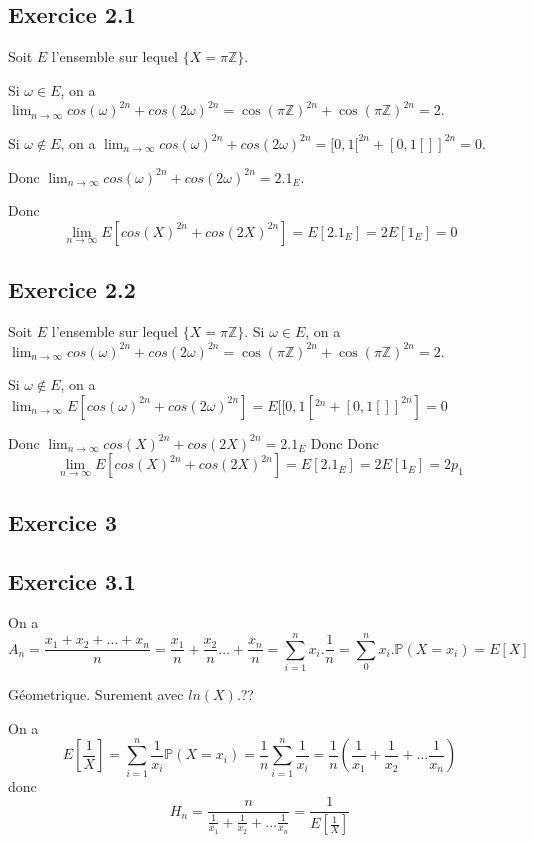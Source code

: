 \documentclass[]{book}
\theoremstyle{definition}
\newcommand{\bb}[1]{\mathbb{#1}}
\newcommand{\Z}{\bb{Z}}
\newcommand{\Pe}{\bb{P}}
\begin{document}
\subsection*{Exercice 2.1}
Soit $E$ l'ensemble sur lequel $\{X = \pi \Z \}$. 


Si $\omega \in E$, on a $\lim_{n \to \infty} cos(\omega)^{2n} + cos(2\omega)^{2n} = \cos(\pi\Z)^{2n}+\cos(\pi\Z)^{2n} = 2$. 

Si $\omega \notin E$, on a $\lim_{n \to \infty} cos(\omega)^{2n} + cos(2\omega)^{2n} = [0,1[^{2n}+[0,1[]]^{2n} = 0$. 

Donc $\lim_{n \to \infty} cos(\omega)^{2n} + cos(2\omega)^{2n} = 2.1_E$.

Donc 
$$
\lim_{n \to \infty} E[cos(X)^{2n} + cos(2X)^{2n}] = E[2.1_E] = 2E[1_E] = 0
$$

\subsection*{Exercice 2.2}
Soit $E$ l'ensemble sur lequel $\{X = \pi \Z \}$. 
Si $\omega \in E$, on a $\lim_{n \to \infty} cos(\omega)^{2n} + cos(2\omega)^{2n} = \cos(\pi\Z)^{2n}+\cos(\pi\Z)^{2n} = 2$. 

Si $\omega \notin E$, on a $\lim_{n \to \infty} E[cos(\omega)^{2n} + cos(2\omega)^{2n}] = E[[0,1[^{2n}+[0,1[]]^{2n}] = 0$

Donc $\lim_{n \to \infty} cos(X)^{2n} + cos(2X)^{2n} = 2.1_E$
Donc
Donc 
$$
\lim_{n \to \infty} E[cos(X)^{2n} + cos(2X)^{2n}] = E[2.1_E] = 2E[1_E] = 2p_1
$$


\subsection*{Exercice 3}
\subsection*{Exercice 3.1}
On a 
$$
A_n = \frac{x_1+x_2+\ldots + x_n}{n} = \frac{x_1}{n}+ \frac{x_2}{n} \ldots + \frac{x_n}{n} = \sum_{i=1}^{n}x_i.\frac{1}{n} = \sum_{0}^{n}x_i.\Pe(X=x_i) = E[X]
$$

G\'eometrique. Surement avec $ln(X)$.??

On a
$$
E[\frac{1}{X}] = \sum_{i=1}^{n}{\frac{1}{x_i}\Pe(X=x_i)} =  \frac{1}{n}\sum_{i=1}^{n}{\frac{1}{x_i}} = \frac{1}{n}(\frac{1}{x_1}+\frac{1}{x_2}+ \ldots \frac{1}{x_n})
$$
donc
$$
H_n = \frac{n}{\frac{1}{x_1}+\frac{1}{x_2}+ \ldots \frac{1}{x_n}} = \frac{1}{E[\frac{1}{X}]}
$$
\end{document}
